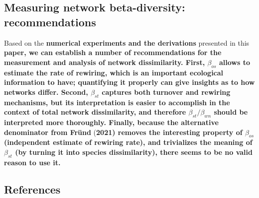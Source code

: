 \documentclass[11pt]{article}
\makeatletter
\def\maxwidth{\ifdim\Gin@nat@width>\linewidth\linewidth
\else\Gin@nat@width\fi}
\let\Oldincludegraphics\includegraphics
\renewcommand{\includegraphics}[1]{\Oldincludegraphics[width=\maxwidth]{#1}}
\providecommand{\DIFaddtex}[1]{{\bf #1}} %
\providecommand{\DIFdeltex}[1]{} %
\providecommand{\DIFaddbegin}{\protect\color{blue}} %
\providecommand{\DIFaddend}{\protect\color{black}} %
\providecommand{\DIFdelbegin}{\protect\color{red}} %
\providecommand{\DIFdelend}{\protect\color{black}} %
\providecommand{\DIFadd}[1]{\texorpdfstring{\DIFaddtex{#1}}{#1}} %
\providecommand{\DIFdel}[1]{\texorpdfstring{\DIFdeltex{#1}}{}} %
\newcommand{\DIFscaledelfig}{0.5}
\newlength{\DIFdelgraphicswidth} %
\newlength{\DIFdelgraphicsheight} %
\newcommand{\DIFaddincludegraphics}[2][]{{\color{blue}\fbox{\DIFOincludegraphics[#1]{#2}}}} %
\newcommand{\DIFdelincludegraphics}[2][]{%
\sbox{\DIFdelgraphicsbox}{\DIFOincludegraphics[#1]{#2}}%
\settoboxwidth{\DIFdelgraphicswidth}{\DIFdelgraphicsbox} %
\settoboxtotalheight{\DIFdelgraphicsheight}{\DIFdelgraphicsbox} %
\scalebox{\DIFscaledelfig}{%
\parbox[b]{\DIFdelgraphicswidth}{\usebox{\DIFdelgraphicsbox}\\[-\baselineskip] \rule{\DIFdelgraphicswidth}{0em}}\llap{\resizebox{\DIFdelgraphicswidth}{\DIFdelgraphicsheight}{%
\setlength{\unitlength}{\DIFdelgraphicswidth}%
\begin{picture}(1,1)%
\thicklines\linethickness{2pt} %
{\color[rgb]{1,0,0}\put(0,0){\framebox(1,1){}}}%
{\color[rgb]{1,0,0}\put(0,0){\line( 1,1){1}}}%
{\color[rgb]{1,0,0}\put(0,1){\line(1,-1){1}}}%
\end{picture}%
}\hspace*{3pt}}} %
} %
\DeclareRobustCommand{\DIFaddbegin}{\DIFOaddbegin \let\includegraphics\DIFaddincludegraphics} %
\DeclareRobustCommand{\DIFaddend}{\DIFOaddend \let\includegraphics\DIFOincludegraphics} %
\DeclareRobustCommand{\DIFdelbegin}{\DIFOdelbegin \let\includegraphics\DIFdelincludegraphics} %
\DeclareRobustCommand{\DIFdelend}{\DIFOaddend \let\includegraphics\DIFOincludegraphics} %
\makeatother
\begin{document}
\hypertarget{measuring-network-beta-diversity-recommendations}{%
\subsection{Measuring network beta-diversity:
recommendations}\label{measuring-network-beta-diversity-recommendations}}

\DIFaddend Based on the \DIFdelbegin \DIFdel{results }\DIFdelend \DIFaddbegin \DIFadd{numerical experiments and the derivations }\DIFaddend presented in this
\DIFdelbegin \DIFdel{contribution, I argue that the original partition of network \(\beta\)-diversity from Poisot \emph{et
al.} }\DIFdelend \DIFaddbegin \DIFadd{paper, we can establish a number of recommendations for the measurement
and analysis of network dissimilarity. First, \(\beta_{os}\) allows to
estimate the rate of rewiring, which is an important ecological
information to have; quantifying it properly can give insights as to how
networks differ. Second, \(\beta_{st}\) captures both turnover and
rewiring mechanisms, but its interpretation is easier to accomplish in
the context of total network dissimilarity, and therefore
\(\beta_{st}/\beta_{wn}\) should be interpreted more thoroughly.
Finally, because the alternative denominator from Fründ }\DIFaddend (\DIFdelbegin \DIFdel{2012) should remain the default. }\DIFdelend \DIFaddbegin \DIFadd{2021) removes
the interesting property of \(\beta_{os}\) (independent estimate of
rewiring rate), and trivializes the meaning of \(\beta_{st}\) (by
turning it into species dissimilarity), there seems to be no valid
reason to use it.
}\DIFaddend 

\hypertarget{references}{%
\subsection*{References}\label{references}}
\end{document}
